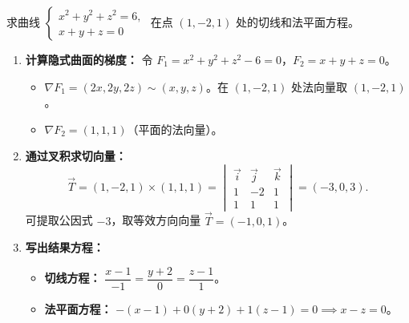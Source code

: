 \documentclass[lang=cn,11pt]{elegantbook}
\begin{document}
\begin{exercise}[隐式交线切线二]
求曲线 $\begin{cases} x^2+y^2+z^2=6, \\ x+y+z=0 \end{cases}$ 在点 $(1,-2,1)$ 处的切线和法平面方程。
\end{exercise}
\begin{solution}
\begin{enumerate}
    \item \textbf{计算隐式曲面的梯度：}
    令 $F_1 = x^2+y^2+z^2-6 = 0$，$F_2 = x+y+z = 0$。
    \begin{itemize}
        \item $\nabla F_1 = (2x, 2y, 2z) \sim (x,y,z)$。在 $(1,-2,1)$ 处法向量取 $(1, -2, 1)$。
        \item $\nabla F_2 = (1, 1, 1)$（平面的法向量）。
    \end{itemize}

    \item \textbf{通过叉积求切向量：}
    \[ \vec{T} = (1, -2, 1) \times (1, 1, 1) = \begin{vmatrix} \vec{i} & \vec{j} & \vec{k} \\ 1 & -2 & 1 \\ 1 & 1 & 1 \end{vmatrix} = (-3, 0, 3). \]
    可提取公因式 $-3$，取等效方向向量 $\vec{T} = (-1, 0, 1)$。

    \item \textbf{写出结果方程：}
    \begin{itemize}
        \item \textbf{切线方程：} $\dfrac{x-1}{-1} = \dfrac{y+2}{0} = \dfrac{z-1}{1}$。
        \item \textbf{法平面方程：} $-(x-1) + 0(y+2) + 1(z-1) = 0 \implies x-z=0$。
    \end{itemize}
\end{enumerate}
\end{solution}
\end{document}
